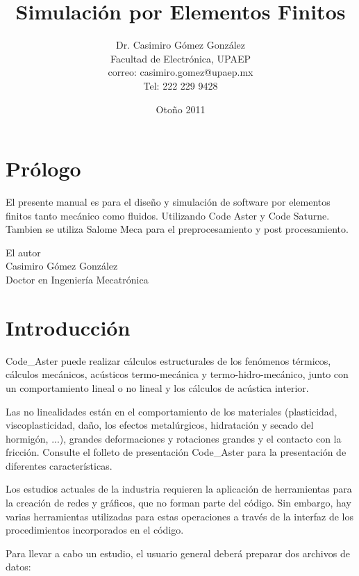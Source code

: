 \documentclass[12pt]{book}
\title{Simulación por Elementos Finitos}
\author{Dr. Casimiro Gómez González\\
	Facultad de Electrónica, UPAEP\\
               correo: casimiro.gomez@upaep.mx\\
               Tel: 222 229 9428}
\date{Otoño 2011}
\theoremstyle{definition}
\theoremstyle{remark}
\theoremstyle{plain}
\begin{document}
\frontmatter
\maketitle

\chapter{Prólogo}

El presente manual es para el diseño y simulación de software por elementos finitos tanto mecánico como fluidos. Utilizando Code Aster y Code Saturne. 
Tambien se utiliza Salome Meca para el preprocesamiento y post procesamiento.

\begin{flushright}

El autor\\
Casimiro Gómez González\\
Doctor en Ingeniería Mecatrónica
\end{flushright}

\tableofcontents

\mainmatter
\chapter{Introducción}
Code\_Aster puede realizar cálculos estructurales de los fenómenos térmicos, 
cálculos mecánicos, acústicos termo-mecánica y termo-hidro-mecánico, junto con 
un comportamiento lineal o no lineal y los cálculos de acústica interior.

Las no linealidades están en el comportamiento de los materiales 
(plasticidad, viscoplasticidad, daño, los efectos metalúrgicos, hidratación y 
secado del hormigón, ...), grandes deformaciones y rotaciones grandes y el 
contacto con la fricción. Consulte el folleto de presentación Code\_Aster para 
la presentación de diferentes características.

Los estudios actuales de la industria requieren la aplicación de herramientas para la 
creación de redes y gráficos, que no forman parte del código. Sin embargo, 
hay varias herramientas utilizadas para estas operaciones a través de la interfaz 
de los procedimientos incorporados en el código.

Para llevar a cabo un estudio, el usuario general deberá preparar dos archivos de datos:
\end{document}
